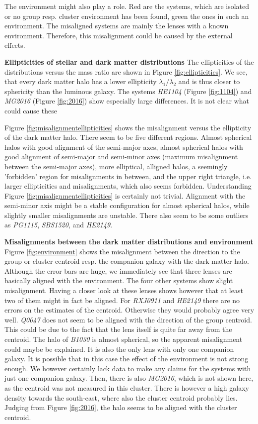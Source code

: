 \documentclass[useAMS,usenatbib]{mn2e}
\begin{document}
The environment might also play a role. Red are the systems, which are isolated or no group resp. cluster environment has been found, green the ones in such an environment. The misaligned systems are mainly the lenses with a known environment. Therefore, this misalignment could be caused by the external effects.


\textbf{Ellipticities of stellar and dark matter distributions}
The ellipticities of the distributions versus the mass ratio are shown in Figure \ref{fig:ellipticities}. We see, that every dark matter halo has a lower ellipticity $\lambda_{1}/\lambda_{2}$ and is thus closer to sphericity than the luminous galaxy. The systems \textit{HE1104} (Figure \ref{fig:1104}) and \textit{MG2016} (Figure \ref{fig:2016}) show especially large differences. It is not clear what could cause these

Figure \ref{fig:misalignmentellipticities} shows the misalignment versus the ellipticity of the dark matter halo. There seem to be five different regions. Almost spherical halos with good alignment of the semi-major axes, almost spherical halos with good alignment of semi-major and semi-minor axes (maximum misalignment between the semi-major axes), more elliptical, alligned halos, a seemingly 'forbidden' region for misalignments in between, and the upper right triangle, i.e. larger ellipticities and misalignments, which also seems forbidden. Understanding Figure \ref{fig:misalignmentellipticities} is certainly not trivial. Alignment with the semi-minor axis might be a stable configuration for almost spherical halos, while slightly smaller misalignments are unstable. There also seem to be some outliers as \textit{PG1115}, \textit{SBS1520}, and \textit{HE2149}.


\textbf{Misalignments between the dark matter distributions and environment}
Figure \ref{fig:environment} shows the misalignment between the direction to the group or cluster centroid resp. the companion galaxy with the dark matter halo. Although the error bars are huge, we immediately see that three lenses are basically aligned with the environment. The four other systems show slight misalignment. Having a closer look at these lenses shows however that at least two of them might in fact be aligned. For \textit{RXJ0911} and \textit{HE2149} there are no errors on the estimates of the centroid. Otherwise they would probably agree very well. \textit{Q0047} does not seem to be aligned with the direction of the group centroid. This could be due to the fact that the lens itself is quite far away from the centroid. The halo of \textit{B1030} is almost spherical, so the apparent misalignment could maybe be explained. It is also the only lens with only one companion galaxy. It is possible that in this case the effect of the environment is not strong enough. We however certainly lack data to make any claims for the systems with just one companion galaxy. Then, there is also \textit{MG2016}, which is not shown here, as the centroid was not measured in this cluster. There is however a high galaxy density towards the south-east, where also the cluster centroid probably lies. Judging from Figure \ref{fig:2016}, the halo seems to be aligned with the cluster centroid.
\end{document}
